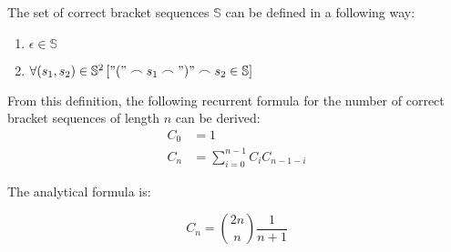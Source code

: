 The set of correct bracket sequences $\mathbb{S}$ can be defined in a following way:
\begin{enumerate}
  \item $\epsilon \in \mathbb{S}$
  \item $\forall (s_1, s_2) \in \mathbb{S}^2\left["(" \frown s_1 \frown ")" \frown s_2 \in \mathbb{S}\right]$
\end{enumerate}

From this definition, the following recurrent formula for the number of correct bracket sequences of length $n$ can be derived: \\
\begin{align*}
  C_0 &= 1 \\
  C_n &= \sum\limits_{i=0}^{n - 1} C_i C_{n - 1 - i}
\end{align*}

The analytical formula is:

\begin{equation*}
  C_n = \binom{2n}{n} \frac{1}{n + 1}
\end{equation*}

